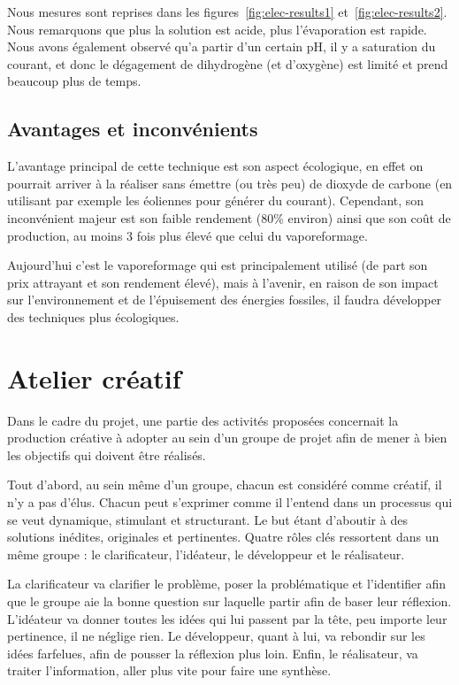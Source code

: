 Nous mesures sont reprises dans les figures~\ref{fig:elec-results1}
et~\ref{fig:elec-results2}.
Nous remarquons que plus la solution est acide, plus l'évaporation est rapide. Nous avons également observé qu'a partir d'un certain pH, il y a saturation du courant, et donc le dégagement de dihydrogène (et d'oxygène) est limité et prend beaucoup plus de temps.

\subsection{Avantages et inconvénients}
L'avantage principal de cette technique est son aspect écologique, en effet on pourrait arriver à la réaliser sans émettre (ou très peu) de dioxyde de carbone (en utilisant par exemple les éoliennes pour générer du courant). Cependant, son inconvénient majeur est son faible rendement (80\% environ) ainsi que son coût de production, au moins 3 fois plus élevé que celui du vaporeformage. \cite{wehicles-elec}

Aujourd'hui c'est le vaporeformage qui est principalement utilisé (de part son prix attrayant et son rendement élevé), mais à l'avenir, en raison de son impact sur l'environnement et de l'épuisement des énergies fossiles, il faudra développer des techniques plus écologiques. \cite{wehicles-vapo}

\section{Atelier créatif}
Dans le cadre du projet, une partie des activités proposées concernait la production créative à adopter au sein d'un groupe de projet afin de mener à bien les objectifs qui doivent être réalisés.

Tout d'abord, au sein même d'un groupe, chacun est considéré comme créatif, il n'y a pas d'élus. Chacun peut s'exprimer comme il l'entend dans un processus qui se veut dynamique, stimulant et structurant. Le but étant d'aboutir à des solutions inédites, originales et pertinentes.
Quatre rôles clés ressortent dans un même groupe : le clarificateur, l'idéateur, le développeur et le réalisateur.

La clarificateur va clarifier le problème, poser la problématique et l'identifier afin que le groupe aie la bonne question sur laquelle partir afin de baser leur réflexion. L'idéateur va donner toutes les idées qui lui passent par la tête, peu importe leur pertinence, il ne néglige rien. Le développeur, quant à lui, va rebondir sur les idées farfelues, afin de pousser la réflexion plus loin. Enfin, le réalisateur, va traiter l'information, aller plus vite pour faire une synthèse.

